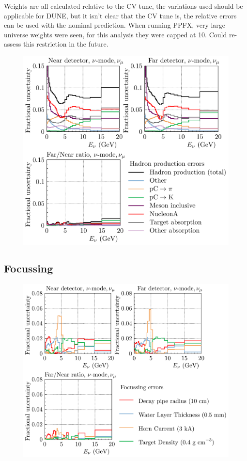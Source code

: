 \documentclass{article}
\begin{document}
Weights are all calculated relative to the CV tune, the variations used should be applicable for DUNE, but it isn't clear that the CV tune is, the relative errors can be used with the nominal prediction.
When running PPFX, very large universe weights were seen, for this analysis they were capped at 10. Could re-assess this restriction in the future.

\begin{figure}
  \includegraphics[width=\textwidth]{plots/fracerrs/numode_numu_PPFX}
  \caption{}
  \label{fig:ppfx_nu_numu}
\end{figure}

\subsection{Focussing}

\begin{figure}
  \includegraphics[width=\textwidth]{plots/fracerrs/numode_numu_Focussing}
  \caption{}
  \label{fig:foc_nu_numu}
\end{figure}
\end{document}
